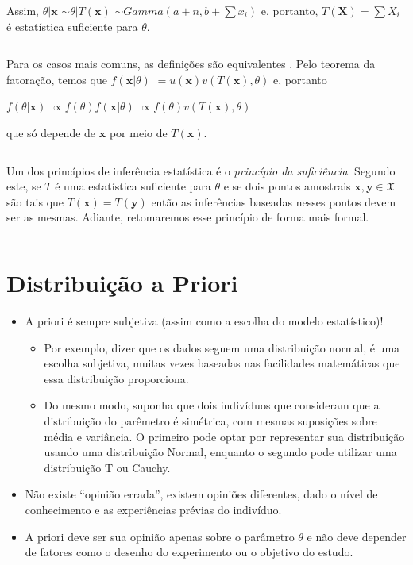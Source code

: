 \documentclass[
]{book}
\providecommand{\tightlist}{%
  \setlength{\itemsep}{0pt}\setlength{\parskip}{0pt}}
\begin{document}
Assim, \(\theta|\boldsymbol x\) \(\sim \theta|T(\boldsymbol x)\) \(\sim Gamma\left(a+n,b+\sum x_i\right)\) e, portanto, \(T(\boldsymbol X) = \sum X_i\) é estatística suficiente para \(\theta\).

\(~\)

Para os casos mais comuns, as definições são equivalentes \citep{Schervish12}. Pelo teorema da fatoração, temos que \(f\left(\boldsymbol x | \theta\right)\) \(= u(\boldsymbol x) v\left(T(\boldsymbol x),\theta\right)\) e, portanto

\(f(\theta|\boldsymbol x)\) \(\propto f(\theta) f\left(\boldsymbol x | \theta\right)\) \(\propto f(\theta) v\left(T(\boldsymbol x),\theta\right)\)

que só depende de \(\boldsymbol x\) por meio de \(T(\boldsymbol x)\).

\(~\)

Um dos princípios de inferência estatística é o \emph{princípio da suficiência}. Segundo este, se \(T\) é uma estatística suficiente para \(\theta\) e se dois pontos amostrais \(\boldsymbol x, \boldsymbol y \in \mathfrak{X}\) são tais que \(T(\boldsymbol x)=T(\boldsymbol y)\) então as inferências baseadas nesses pontos devem ser as mesmas. Adiante, retomaremos esse princípio de forma mais formal.

\(~\)

\hypertarget{distribuiuxe7uxe3o-a-priori}{%
\section{Distribuição a Priori}\label{distribuiuxe7uxe3o-a-priori}}

\begin{itemize}
\tightlist
\item
  A priori é sempre subjetiva (assim como a escolha do modelo estatístico)!

  \begin{itemize}
  \tightlist
  \item
    Por exemplo, dizer que os dados seguem uma distribuição normal, é uma escolha subjetiva, muitas vezes baseadas nas facilidades matemáticas que essa distribuição proporciona.\\
  \item
    Do mesmo modo, suponha que dois indivíduos que consideram que a distribuição do parêmetro é simétrica, com mesmas suposições sobre média e variância. O primeiro pode optar por representar sua distribuição usando uma distribuição Normal, enquanto o segundo pode utilizar uma distribuição T ou Cauchy.\\
  \end{itemize}
\item
  Não existe ``opinião errada'', existem opiniões diferentes, dado o nível de conhecimento e as experiências prévias do indivíduo.\\
\item
  A priori deve ser sua opinião apenas sobre o parâmetro \(\theta\) e não deve depender de fatores como o desenho do experimento ou o objetivo do estudo.
\end{itemize}
\end{document}

